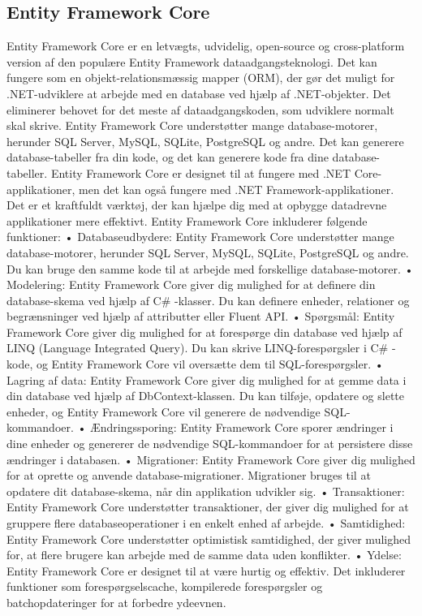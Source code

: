 \subsection{Entity Framework Core}
Entity Framework Core er en letvægts, udvidelig, open-source og cross-platform version af den populære Entity Framework dataadgangsteknologi.
Det kan fungere som en objekt-relationsmæssig mapper (ORM), der gør det muligt for .NET-udviklere at arbejde med en database ved hjælp af .NET-objekter.
Det eliminerer behovet for det meste af dataadgangskoden, som udviklere normalt skal skrive. Entity Framework Core understøtter mange database-motorer, herunder SQL Server, MySQL, SQLite, PostgreSQL og andre.
Det kan generere database-tabeller fra din kode, og det kan generere kode fra dine database-tabeller.
Entity Framework Core er designet til at fungere med .NET Core-applikationer, men det kan også fungere med .NET Framework-applikationer.
Det er et kraftfuldt værktøj, der kan hjælpe dig med at opbygge datadrevne applikationer mere effektivt. Entity Framework Core inkluderer følgende funktioner:
•	Databaseudbydere: Entity Framework Core understøtter mange database-motorer, herunder SQL Server, MySQL, SQLite, PostgreSQL og andre. Du kan bruge den samme kode til at arbejde med forskellige database-motorer.
•	Modelering: Entity Framework Core giver dig mulighed for at definere din database-skema ved hjælp af C\# -klasser. Du kan definere enheder, relationer og begrænsninger ved hjælp af attributter eller Fluent API.
•	Spørgsmål: Entity Framework Core giver dig mulighed for at forespørge din database ved hjælp af LINQ (Language Integrated Query). Du kan skrive LINQ-forespørgsler i C\# -kode, og Entity Framework Core vil oversætte dem til SQL-forespørgsler.
•	Lagring af data: Entity Framework Core giver dig mulighed for at gemme data i din database ved hjælp af DbContext-klassen. Du kan tilføje, opdatere og slette enheder, og Entity Framework Core vil generere de nødvendige SQL-kommandoer.
•	Ændringssporing: Entity Framework Core sporer ændringer i dine enheder og genererer de nødvendige SQL-kommandoer for at persistere disse ændringer i databasen.
•	Migrationer: Entity Framework Core giver dig mulighed for at oprette og anvende database-migrationer. Migrationer bruges til at opdatere dit database-skema, når din applikation udvikler sig.
•	Transaktioner: Entity Framework Core understøtter transaktioner, der giver dig mulighed for at gruppere flere databaseoperationer i en enkelt enhed af arbejde.
•	Samtidighed: Entity Framework Core understøtter optimistisk samtidighed, der giver mulighed for, at flere brugere kan arbejde med de samme data uden konflikter.
•	Ydelse: Entity Framework Core er designet til at være hurtig og effektiv. Det inkluderer funktioner som forespørgselscache, kompilerede forespørgsler og batchopdateringer for at forbedre ydeevnen.

